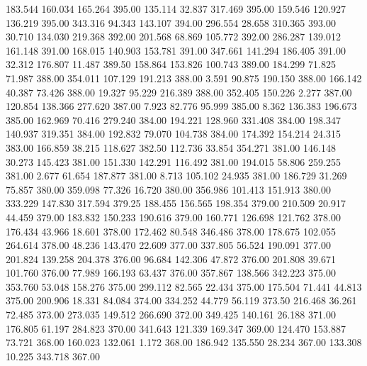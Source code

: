  183.544  160.034  165.264       395.00
 135.114   32.837  317.469       395.00
 159.546  120.927  136.219       395.00
 343.316   94.343  143.107       394.00
 296.554   28.658  310.365       393.00
  30.710  134.030  219.368       392.00
 201.568   68.869  105.772       392.00
 286.287  139.012  161.148       391.00
 168.015  140.903  153.781       391.00
 347.661  141.294  186.405       391.00
  32.312  176.807   11.487       389.50
 158.864  153.826  100.743       389.00
 184.299   71.825   71.987       388.00
 354.011  107.129  191.213       388.00
   3.591   90.875  190.150       388.00
 166.142   40.387   73.426       388.00
  19.327   95.229  216.389       388.00
 352.405  150.226    2.277       387.00
 120.854  138.366  277.620       387.00
   7.923   82.776   95.999       385.00
   8.362  136.383  196.673       385.00
 162.969   70.416  279.240       384.00
 194.221  128.960  331.408       384.00
 198.347  140.937  319.351       384.00
 192.832   79.070  104.738       384.00
 174.392  154.214   24.315       383.00
 166.859   38.215  118.627       382.50
 112.736   33.854  354.271       381.00
 146.148   30.273  145.423       381.00
 151.330  142.291  116.492       381.00
 194.015   58.806  259.255       381.00
   2.677   61.654  187.877       381.00
   8.713  105.102   24.935       381.00
 186.729   31.269   75.857       380.00
 359.098   77.326   16.720       380.00
 356.986  101.413  151.913       380.00
 333.229  147.830  317.594       379.25
 188.455  156.565  198.354       379.00
 210.509   20.917   44.459       379.00
 183.832  150.233  190.616       379.00
 160.771  126.698  121.762       378.00
 176.434   43.966   18.601       378.00
 172.462   80.548  346.486       378.00
 178.675  102.055  264.614       378.00
  48.236  143.470   22.609       377.00
 337.805   56.524  190.091       377.00
 201.824  139.258  204.378       376.00
  96.684  142.306   47.872       376.00
 201.808   39.671  101.760       376.00
  77.989  166.193   63.437       376.00
 357.867  138.566  342.223       375.00
 353.760   53.048  158.276       375.00
 299.112   82.565   22.434       375.00
 175.504   71.441   44.813       375.00
 200.906   18.331   84.084       374.00
 334.252   44.779   56.119       373.50
 216.468   36.261   72.485       373.00
 273.035  149.512  266.690       372.00
 349.425  140.161   26.188       371.00
 176.805   61.197  284.823       370.00
 341.643  121.339  169.347       369.00
 124.470  153.887   73.721       368.00
 160.023  132.061    1.172       368.00
 186.942  135.550   28.234       367.00
 133.308   10.225  343.718       367.00
